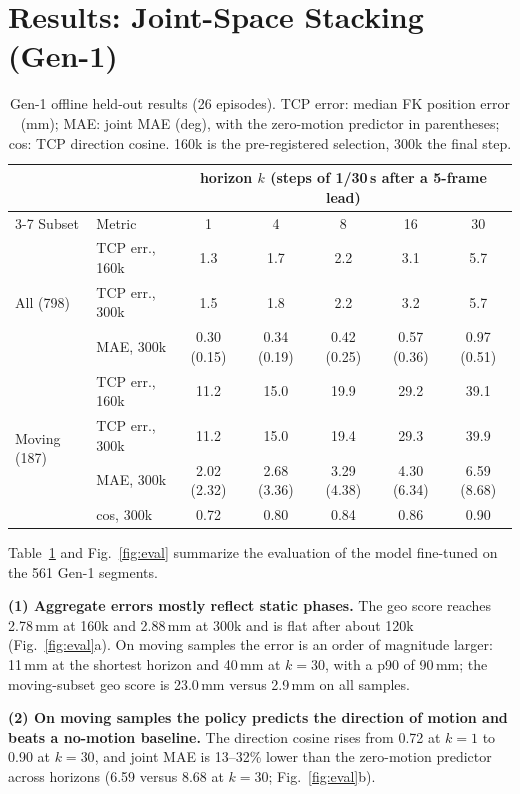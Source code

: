 \documentclass[conference,10pt]{IEEEtran}
\newcommand{\mm}{\,mm\xspace}
\begin{document}
\section{Results: Joint-Space Stacking (Gen-1)}\label{sec:res1}
\begin{table}[t]
\centering\footnotesize
\setlength{\tabcolsep}{7pt}
\caption{Gen-1 offline held-out results (26 episodes). TCP error: median FK position error (mm); MAE: joint MAE (deg), with the
zero-motion predictor in parentheses; cos: TCP direction cosine. 160k is the pre-registered selection, 300k the final step.}
\label{tab:results}
\begin{tabular}{@{}llccccc@{}}
\toprule
 & & \multicolumn{5}{c}{horizon $k$ (steps of 1/30\,s after a 5-frame lead)} \\
\cmidrule(l){3-7}
Subset & Metric & 1 & 4 & 8 & 16 & 30 \\
\midrule
\multirow{3}{*}{All (798)} & TCP err., 160k & 1.3 & 1.7 & 2.2 & 3.1 & 5.7 \\
 & TCP err., 300k & 1.5 & 1.8 & 2.2 & 3.2 & 5.7 \\
 & MAE, 300k & 0.30 (0.15) & 0.34 (0.19) & 0.42 (0.25) & 0.57 (0.36) & 0.97 (0.51) \\
\midrule
\multirow{4}{*}{Moving (187)} & TCP err., 160k & 11.2 & 15.0 & 19.9 & 29.2 & 39.1 \\
 & TCP err., 300k & 11.2 & 15.0 & 19.4 & 29.3 & 39.9 \\
 & MAE, 300k & 2.02 (2.32) & 2.68 (3.36) & 3.29 (4.38) & 4.30 (6.34) & 6.59 (8.68) \\
 & cos, 300k & 0.72 & 0.80 & 0.84 & 0.86 & 0.90 \\
\bottomrule
\end{tabular}
\end{table}

Table~\ref{tab:results} and Fig.~\ref{fig:eval} summarize the evaluation of the model fine-tuned on the 561 Gen-1 segments.

\textbf{(1) Aggregate errors mostly reflect static phases.} The geo score reaches 2.78\mm at 160k and 2.88\mm at 300k and is flat
after about 120k (Fig.~\ref{fig:eval}a). On moving samples the error is an order of magnitude larger: 11\mm at the shortest horizon
and 40\mm at $k{=}30$, with a p90 of 90\mm; the moving-subset geo score is 23.0\mm versus 2.9\mm on all samples.

\textbf{(2) On moving samples the policy predicts the direction of motion and beats a no-motion baseline.} The direction cosine
rises from 0.72 at $k{=}1$ to 0.90 at $k{=}30$, and joint MAE is 13--32\% lower than the zero-motion predictor across horizons
(6.59 versus 8.68\textdegree{} at $k{=}30$; Fig.~\ref{fig:eval}b).
\end{document}
